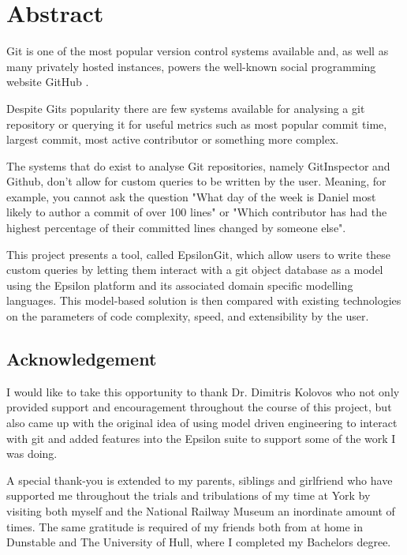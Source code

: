 \documentclass[11pt]{book}
\begin{document}
\chapter*{\centering Abstract}
\begin{center}
	\parbox{350pt}{
Git is one of the most popular version control systems available \cite{gitpopularity} and, as well as many privately hosted instances, powers the well-known social programming website GitHub \cite{gitpowersgithub}.

Despite Gits popularity there are few systems available for analysing a git repository or querying it for useful metrics such as most popular commit time, largest commit, most active contributor or something more complex.

The systems that do exist to analyse Git repositories, namely GitInspector \cite{gitinspector} and Github, don't allow for custom queries to be written by the user. Meaning, for example, you cannot ask the question "What day of the week is Daniel most likely to author a commit of over 100 lines" or "Which contributor has had the highest percentage of their committed lines changed by someone else". 

This project presents a tool, called EpsilonGit, which allow users to write these custom queries by letting them interact with a git object database as a model using the Epsilon platform and its associated domain specific modelling languages. This model-based solution is then compared with existing technologies on the parameters of code complexity, speed, and extensibility by the user.
}
\end{center}

\clearpage

\section*{Acknowledgement}
I would like to take this opportunity to thank Dr. Dimitris Kolovos who not only provided support and encouragement throughout the course of this project, but also came up with the original idea of using model driven engineering to interact with git and added features into the Epsilon suite to support some of the work I was doing.

A special thank-you is extended to my parents, siblings and girlfriend who have supported me throughout the trials and tribulations of my time at York by visiting both myself and the National Railway Museum an inordinate amount of times. The same gratitude is required of my friends both from at home in Dunstable and The University of Hull, where I completed my Bachelors degree. %
\end{document}
